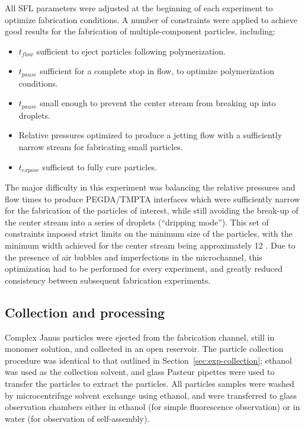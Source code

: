 All SFL parameters were adjusted at the beginning of each experiment to optimize fabrication 
conditions.  A number of constraints were applied to achieve good results for 
the fabrication of multiple-component particles, including:

\begin{itemize}
\item $t_{flow}$ sufficient to eject particles following polymerization.
\item $t_{pause}$ sufficient for a complete stop in flow, to optimize polymerization conditions.
\item $t_{pause}$ small enough to prevent the center stream from breaking up into droplets.
\item Relative pressures optimized to produce a jetting flow with a sufficiently narrow stream
for fabricating small particles.
\item $t_{expose}$ sufficient to fully cure particles.
\end{itemize}

The major difficulty in this experiment was balancing the relative pressures and flow times to produce
PEGDA/TMPTA interfaces which were sufficiently narrow for the fabrication of the particles of interest,
while still avoiding the break-up of the center stream into a series of droplets (``dripping mode'').
This set of constraints imposed strict limits on the minimum size of the particles, with
the minimum width achieved for the center stream being approximately 12 \microns.
Due to the presence of air bubbles and imperfections in the microchannel, this optimization had to be
performed for every experiment, and greatly reduced consistency between subsequent fabrication experiments.

\subsection{Collection and processing}

Complex Janus particles were ejected from the fabrication channel, still in monomer solution, and collected
in an open reservoir.  The particle collection procedure was identical to that outlined in 
Section~\ref{sec:exp-collection}; ethanol was used as the collection solvent, and glass Pasteur
pipettes were used to transfer the particles to extract the particles.  All particles samples
were washed by microcentrifuge solvent exchange using ethanol, and were transferred to 
glass observation
chambers either in ethanol (for simple fluorescence observation) or in water (for
observation of self-assembly).


